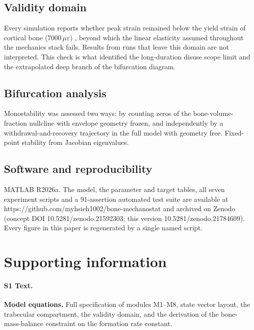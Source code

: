 \documentclass[10pt,letterpaper]{article}
\newcommand{\ue}{\ensuremath{\mu\varepsilon}}
\begin{document}
\subsection*{Validity domain}

Every simulation reports whether peak strain remained below the yield strain
of cortical bone (7000\,\ue) \cite{bayraktar2004}, beyond which the linear
elasticity assumed throughout the mechanics stack fails. Results from runs
that leave this domain are not interpreted. This check is what identified the
long-duration disuse scope limit and the extrapolated deep branch of the
bifurcation diagram.

\subsection*{Bifurcation analysis}

Monostability was assessed two ways: by counting zeros of the
bone-volume-fraction nullcline with envelope geometry frozen, and
independently by a withdrawal-and-recovery trajectory in the full model with
geometry free. Fixed-point stability from Jacobian eigenvalues.

\subsection*{Software and reproducibility}

MATLAB R2026a. The model, the parameter and target tables, all seven
experiment scripts and a 91-assertion automated test suite are available at
https://github.com/myhsieh1002/bone-mechanostat and archived on Zenodo (concept
DOI 10.5281/zenodo.21592303; this version 10.5281/zenodo.21784609). Every figure in this
paper is regenerated by a single named script.

\section*{Supporting information}

\paragraph*{S1 Text.}
\label{S1_Text}
{\bf Model equations.} Full specification of modules M1--M8, state vector
layout, the trabecular compartment, the validity domain, and the derivation of
the bone-mass-balance constraint on the formation rate constant.
\end{document}
